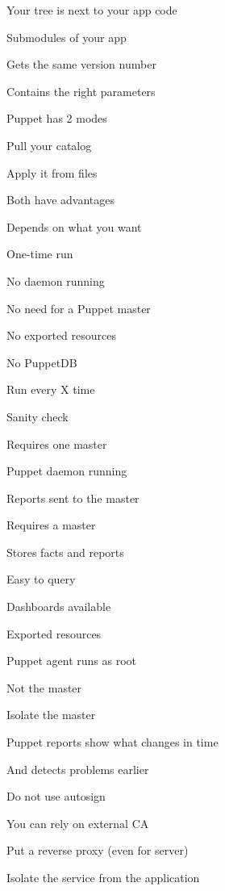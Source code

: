 \begin{iframe}
\item Your tree is next to your app code
\item Submodules of your app
\item Gets the same version number
\item Contains the right parameters
\end{iframe}


\begin{iframe}
\item Puppet has 2 modes
\item Pull your catalog
\item Apply it from files
\item Both have advantages
\item Depends on what you want
\end{iframe}
\begin{iframe}[Masterless]
\item One-time run
\item No daemon running
\item No need for a Puppet master
\item No exported resources
\item No PuppetDB
\end{iframe}
\begin{iframe}
\item Run every X time
\item Sanity check
\item Requires one master
\item Puppet daemon running
\item Reports sent to the master
\end{iframe}
\begin{iframe}[PuppetDB]
\item Requires a master
\item Stores facts and reports
\item Easy to query
\item Dashboards available
\item Exported resources
\end{iframe}
\begin{iframe}[Security]
\item Puppet agent runs as root
\item Not the master
\item Isolate the master
\item Puppet reports show what changes in time
\item And detects problems earlier
\end{iframe}
\begin{iframe}
\item Do not use autosign
\item You can rely on external CA
\item Put a reverse proxy (even for server)
\item Isolate the service from the application
\end{iframe}

